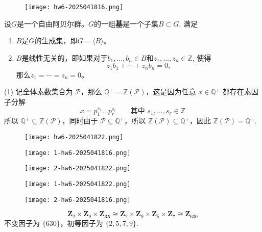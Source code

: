 \begin{exercise}
\begin{figure}[H]
\centering
\texttt{[image: hw6-2025041816.png]}
\label{}
\end{figure}
\end{exercise}
\begin{definition}[自由阿贝尔群的一组基]
设$G$是一个自由阿贝尔群。$G$的一组\textbf{基}是一个子集$B \subset G$, 满足
	\begin{enumerate}
		\item $B$是$G$的生成集，即$G = \langle B \rangle$。
		\item $B$是线性无关的，即如果对于$b_1, \ldots, b_n \in B$和$z_1, \ldots, z_n \in \mathbb{Z}$, 使得
\[
z_1 b_1 + \cdots + z_n b_n = 0,
\]那么$z_1 = \cdots = z_n = 0$。
	\end{enumerate}
\end{definition}
(1) 记全体素数集合为 $\mathcal{P}$，那么 $\mathbb{Q}^{+}=\mathbb{Z}(\mathcal{P})$，这是因为任意 $x\in \mathbb{Q}^{+}$ 都存在素因子分解
\[
x=p_1^{s_1}\dots p_{r}^{s_{r}}\qquad \text{其中 }s_1,\dots,s_{r}\in \mathbb{Z}
\]
所以 $\mathbb{Q}^{+}\subseteq \mathbb{Z}(\mathcal{P})$，同时由于 $\mathcal{P}\subseteq \mathbb{Q}^{+}$，所以 $\mathbb{Z}(\mathcal{P})\subseteq \mathbb{Q}^{+}$，因此 $\mathbb{Z}(\mathcal{P})=\mathbb{Q}^{+}$.

\begin{figure}[H]
\centering
\texttt{[image: hw6-2025041822.png]}
\label{}
\end{figure}

\begin{exercise}
\begin{figure}[H]
\centering
\texttt{[image: 1-hw6-2025041816.png]}
\label{}
\end{figure}
\end{exercise}
\begin{figure}[H]
\centering
\texttt{[image: 2-hw6-2025041822.png]}
\label{}
\end{figure}

\begin{figure}[H]
\centering
\texttt{[image: 1-hw6-2025041822.png]}
\label{}
\end{figure}

\begin{exercise}
\begin{figure}[H]
\centering
\texttt{[image: 2-hw6-2025041816.png]}
\label{}
\end{figure}
\end{exercise}
\[
\mathbf{Z}_{2}\times \mathbf{Z}_{9}\times \mathbf{Z_{35}}\cong \mathbf{Z}_{2}\times \mathbf{Z}_{9}\times \mathbf{Z}_{5}\times \mathbf{Z}_{7}\cong \mathbf{Z}_{630}
\]
不变因子为 $\{ 630 \}$，初等因子为 $\{ 2,5,7,9 \}$.

